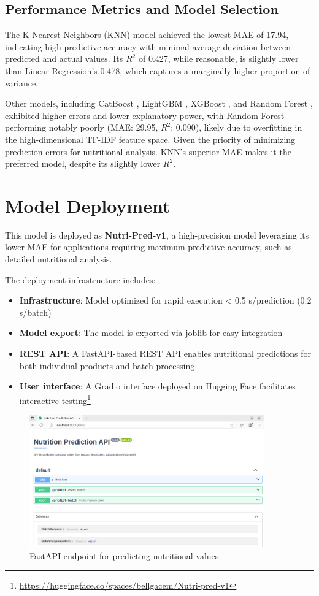 \subsection{Performance Metrics and Model Selection}
 The K-Nearest Neighbors (KNN) model achieved the lowest MAE of 17.94, indicating high predictive accuracy with minimal average deviation between predicted and actual values. Its \(R^2\) of 0.427, while reasonable, is slightly lower than Linear Regression's 0.478, which captures a marginally higher proportion of variance. 
 \par Other models, including CatBoost , LightGBM , XGBoost , and Random Forest , exhibited higher errors and lower explanatory power, with Random Forest performing notably poorly (MAE: 29.95, \(R^2\): 0.090), likely due to overfitting in the high-dimensional TF-IDF feature space. Given the priority of minimizing prediction errors for nutritional analysis. KNN's superior MAE makes it the preferred model, despite its slightly lower \(R^2\). 

\section{Model Deployment}
This model is deployed as \textbf{Nutri-Pred-v1}, a high-precision model leveraging its lower MAE for applications requiring maximum predictive accuracy, such as detailed nutritional analysis.

The deployment infrastructure includes:
\begin{itemize}
    \item \textbf{Infrastructure}: Model optimized for rapid execution < 0.5 s/prediction (0.2 s/batch)
    \item \textbf{Model export}: The model is exported via joblib for easy integration
    \item \textbf{REST API}: A FastAPI-based REST API enables nutritional predictions for both individual products and batch processing
    \item \textbf{User interface}: A Gradio interface deployed on Hugging Face
facilitates interactive testing\footnote{\url{https://huggingface.co/spaces/bellgacem/Nutri-pred-v1}}
\end{itemize}

\begin{figure}[H]
    \centering
    \includegraphics[width=0.90\textwidth]{images/Nutri-pred_fast_API.png}
    \caption{FastAPI endpoint for predicting nutritional values.}
    \label{fig:fastapi-endpoint}
\end{figure}

